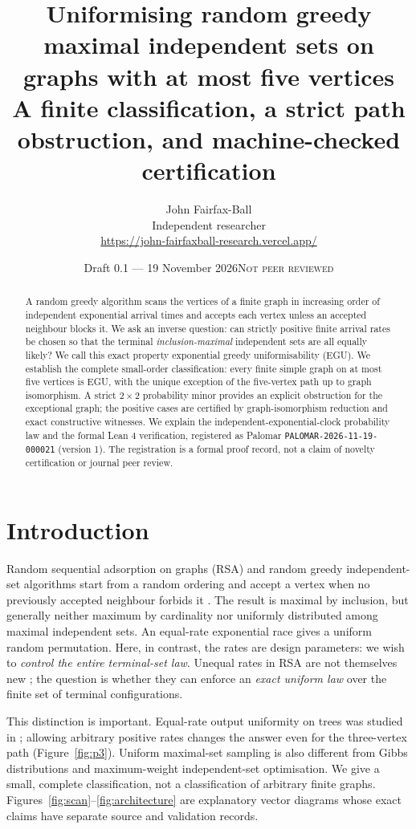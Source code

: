 \documentclass[11pt,a4paper]{article}
\title{\vspace{-1em}\textbf{Uniformising random greedy maximal independent sets on graphs with at most five vertices}\\[5pt]\large A finite classification, a strict path obstruction, and machine-checked certification}
\author{John Fairfax-Ball\\\small Independent researcher\\\small \url{https://john-fairfaxball-research.vercel.app/}}
\date{Draft 0.1 --- 19 November 2026\quad\textsc{Not peer reviewed}}
\begin{document}
\maketitle
\begin{abstract}
A random greedy algorithm scans the vertices of a finite graph in increasing order of independent exponential arrival times and accepts each vertex unless an accepted neighbour blocks it.  We ask an inverse question: can strictly positive finite arrival rates be chosen so that the terminal \emph{inclusion-maximal} independent sets are all equally likely?  We call this exact property exponential greedy uniformisability (EGU).  We establish the complete small-order classification: every finite simple graph on at most five vertices is EGU, with the unique exception of the five-vertex path up to graph isomorphism.  A strict $2\times2$ probability minor provides an explicit obstruction for the exceptional graph; the positive cases are certified by graph-isomorphism reduction and exact constructive witnesses.  We explain the independent-exponential-clock probability law and the formal Lean 4 verification, registered as Palomar \texttt{PALOMAR-2026-11-19-000021} (version 1).  The registration is a formal proof record, not a claim of novelty certification or journal peer review.
\end{abstract}

\section{Introduction}
Random sequential adsorption on graphs (RSA) and random greedy independent-set algorithms start from a random ordering and accept a vertex when no previously accepted neighbour forbids it \citep{Pippenger1989,Krivelevich2024}.  The result is maximal by inclusion, but generally neither maximum by cardinality nor uniformly distributed among maximal independent sets.  An equal-rate exponential race gives a uniform random permutation.  Here, in contrast, the rates are design parameters: we wish to \emph{control the entire terminal-set law}.  Unequal rates in RSA are not themselves new \citep{PenroseRosoman2012}; the question is whether they can enforce an \emph{exact uniform law} over the finite set of terminal configurations.

This distinction is important.  Equal-rate output uniformity on trees was studied in \citet{FairfaxBall2026}; allowing arbitrary positive rates changes the answer even for the three-vertex path (Figure~\ref{fig:p3}).  Uniform maximal-set sampling is also different from Gibbs distributions and maximum-weight independent-set optimisation.  We give a small, complete classification, not a classification of arbitrary finite graphs.  Figures~\ref{fig:scan}--\ref{fig:architecture} are explanatory vector diagrams whose exact claims have separate source and validation records.
\end{document}
